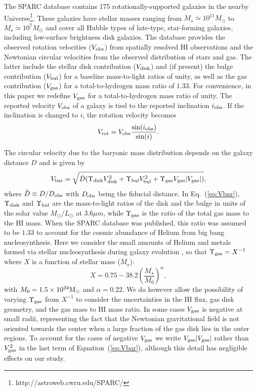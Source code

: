 \documentclass[twocolumn,tighten]{aastex63}
\begin{document}
The SPARC database \citep{Lel16} contains 175 rotationally-supported galaxies in the nearby Universe\footnote{\mbox{http://astroweb.cwru.edu/SPARC/}}. These galaxies have stellar masses ranging from $M_\star \simeq 10^{11} M_\odot$ to $M_\star \simeq 10^{7} M_\odot$ and cover all Hubble types of late-type, star-forming galaxies, including low-surface brightness disk galaxies. The database provides the observed rotation velocities ($V_{\rm obs}$) from spatially resolved HI observations and the Newtonian circular velocities from the observed distribution of stars and gas. The latter include the stellar disk contribution ($V_{\rm disk}$) and (if present) the bulge contribution ($V_{\rm bul}$) for a baseline mass-to-light ratios of unity, as well as the gas contribution ($V_{\rm gas}$) for a total-to-hydrogen mass ratio of $1.33$. For convenience, in this paper we redefine $V_{\rm gas}$ for a total-to-hydrogen mass ratio of unity. The reported velocity $V_{\rm obs}$ of a galaxy is tied to the reported inclination $i_{\rm obs}$. If the inclination is changed to $i$, the rotation velocity becomes
  \begin{equation}
    V_{\rm rot}=V_{\rm obs} \frac{\sin(i_{\rm obs})}{\sin(i)}.
    \label{eq:Vrot}
    \end{equation}

The circular velocity due to the baryonic mass distribution depends on the galaxy distance $D$ and is given by
  \begin{equation}
    V_{\rm bar}=\sqrt{\hat{D}(\Upsilon_{\rm disk}V_{\rm disk}^2+\Upsilon_{\rm bul}V_{\rm bul}^2+\Upsilon_{\rm gas}V_{\rm gas}|V_{\rm gas}|)},
    \label{eq:Vbar}
    \end{equation}
where $\hat{D} \equiv D/D_{\rm obs}$ with $D_{\rm obs}$ being the fiducial distance. In Eq.~(\ref{eq:Vbar}), $\Upsilon_{\rm disk}$ and $\Upsilon_{\rm bul}$ are the mass-to-light ratios of the disk and the bulge in units of the solar value $M_{\odot}/L_{\odot}$ at $3.6\mu m$, while $\Upsilon_{\rm gas}$ is the ratio of the total gas mass to the HI mass. When the SPARC database was published, this ratio was assumed to be $1.33$ to account for the cosmic abundance of Helium from big bang nucleosynthesis. Here we consider the small amounts of Helium and metals formed via stellar nucleosynthesis during galaxy evolution \citep{MLS20}, so that $\Upsilon_{\rm gas} = X^{-1}$ where $X$ is a function of stellar mass ($M_\star$):
  \begin{equation}
    X=0.75-38.2 \left( \frac{M_{\star}}{M_0} \right)^\alpha,
     \label{eq:X1}
  \end{equation}
with $M_0=1.5\times 10^{24}{\rm M}_\odot$ and $\alpha=0.22$. We do however allow the possibility of varying $\Upsilon_{\rm gas}$ from $X^{-1}$ to consider the uncertainties in the HI flux, gas disk geometry, and the gas mass to HI mass ratio. In some cases $V_{\rm gas}$ is negative at small radii, representing the fact that the Newtonian gravitational field is not oriented towards the center when a large fraction of the gas disk lies in the outer regions. To account for the cases of negative $V_{\rm gas}$ we write $V_{\rm gas}|V_{\rm gas}|$ rather than $V_{\rm gas}^2$ in the last term of Equation~(\ref{eq:Vbar}), although this detail has negligible effects on our study.
\end{document}
